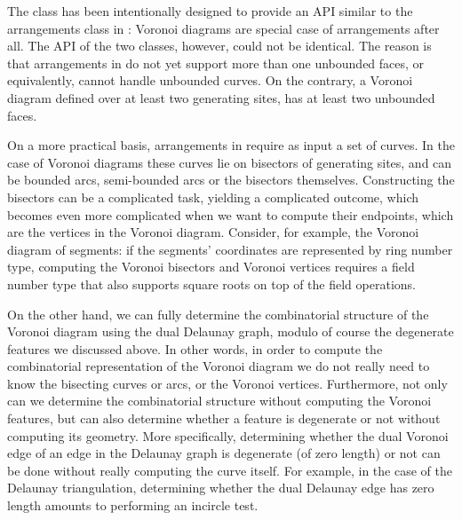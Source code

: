 The  class has been
intentionally designed to provide an API similar to the arrangements
class in \cgal: Voronoi diagrams are special case of arrangements
after all. The API of the two classes, however, could not be
identical. The reason is that arrangements in \cgal do not yet support
more than one unbounded faces, or equivalently, cannot handle
unbounded curves. On the contrary, a Voronoi diagram defined over at
least two generating sites, has at least two unbounded faces.

On a more practical basis, arrangements in \cgal require as input a
set of curves. In the case of Voronoi diagrams these curves lie on
bisectors of generating sites, and can be bounded arcs, semi-bounded
arcs or the bisectors themselves. Constructing the bisectors can be
a complicated task, yielding a complicated outcome, which becomes even
more complicated when we want to compute their endpoints, which are
the vertices in the Voronoi diagram. Consider, for example, the
Voronoi diagram of segments: if the segments' coordinates are represented
by ring number type, computing the Voronoi bisectors and Voronoi
vertices requires a field number type that also supports square roots
on top of the field operations.

On the other hand, we can fully determine the combinatorial structure
of the Voronoi diagram using the dual Delaunay graph, modulo of course
the degenerate features we discussed above. In other words, in order
to compute the combinatorial representation of the Voronoi diagram we
do not really need to know the bisecting curves or arcs, or the
Voronoi vertices. Furthermore, not only can we determine the
combinatorial structure without computing the Voronoi features, but
can also determine whether a feature is degenerate or not without
computing its geometry. More specifically, determining whether the dual
Voronoi edge of an edge in the Delaunay graph is degenerate (of zero
length) or not can be done without really computing the curve itself.
For example, in the case of the Delaunay triangulation, determining
whether the dual Delaunay edge has zero length amounts to performing
an incircle test.

